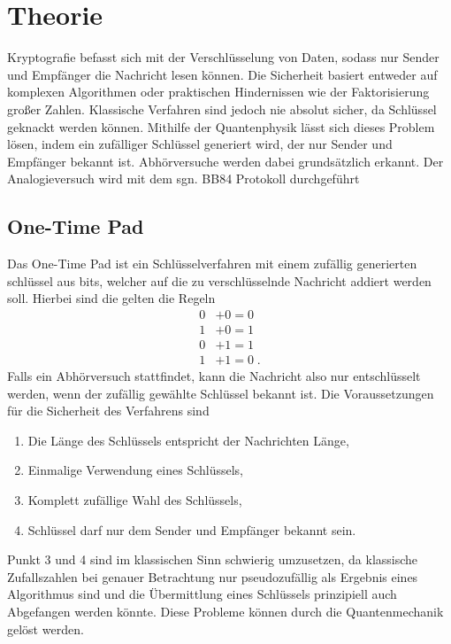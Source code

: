 \section{Theorie}
Kryptografie befasst sich mit der Verschlüsselung von Daten, sodass nur Sender und Empfänger die Nachricht lesen können. Die Sicherheit basiert entweder auf komplexen Algorithmen oder praktischen Hindernissen wie der Faktorisierung großer Zahlen. Klassische Verfahren sind jedoch nie absolut sicher, da Schlüssel geknackt werden können. Mithilfe der Quantenphysik lässt sich dieses Problem lösen, indem ein zufälliger Schlüssel generiert wird, der nur Sender und Empfänger bekannt ist. Abhörversuche werden dabei grundsätzlich erkannt.
Der Analogieversuch wird mit dem sgn. BB84 Protokoll durchgeführt %
\subsection{One-Time Pad}
\label{sec:Blabla}
Das One-Time Pad ist ein Schlüsselverfahren mit einem zufällig generierten schlüssel aus bits, welcher auf die zu verschlüsselnde Nachricht addiert werden soll.
Hierbei sind die gelten die Regeln
\begin{align*}
    0 &+ 0 =0\\
    1 &+0 =1\\
    0&+1 =1\\
    1&+1=0\; .
\end{align*}
Falls ein Abhörversuch stattfindet, kann die Nachricht also nur entschlüsselt werden, wenn der zufällig gewählte Schlüssel bekannt ist.
Die Voraussetzungen für die Sicherheit des Verfahrens sind 
\begin{enumerate}
    \item Die Länge des Schlüssels entspricht der Nachrichten Länge,
    \item Einmalige Verwendung eines Schlüssels,
    \item Komplett zufällige Wahl des Schlüssels,
    \item Schlüssel darf nur dem Sender und Empfänger bekannt sein.
\end{enumerate}

Punkt 3 und 4 sind im klassischen Sinn schwierig umzusetzen, da klassische Zufallszahlen bei genauer Betrachtung nur pseudozufällig als Ergebnis eines Algorithmus sind und die Übermittlung eines Schlüssels prinzipiell auch Abgefangen werden könnte.
Diese Probleme können durch die Quantenmechanik gelöst werden.

